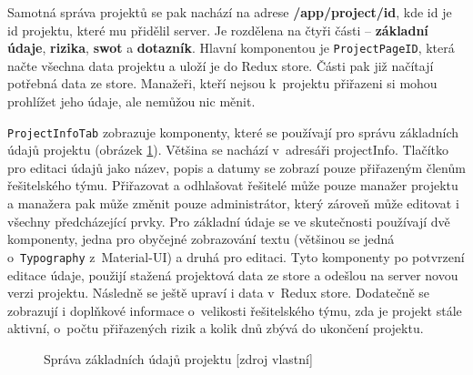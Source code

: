 Samotná správa projektů se pak nachází na adrese \textbf{/app/project/id}, kde id je id projektu, které mu přidělil server. Je rozdělena na čtyři části – \textbf{základní údaje}, \textbf{rizika}, \textbf{swot} a \textbf{dotazník}. Hlavní komponentou je \texttt{ProjectPageID}, která načte všechna data projektu a uloží je do Redux store. Části pak již načítají potřebná data ze store. Manažeři, kteří nejsou k~projektu přiřazeni si mohou prohlížet jeho údaje, ale nemůžou nic měnit.

\texttt{ProjectInfoTab} zobrazuje komponenty, které se používají pro správu základních údajů projektu (obrázek \ref{projinfo}). Většina se nachází v~adresáři projectInfo. Tlačítko pro editaci údajů jako název, popis a datumy se zobrazí pouze přiřazeným členům řešitelského týmu. Přiřazovat a odhlašovat řešitelé může pouze manažer projektu a manažera pak může změnit pouze administrátor, který zároveň může editovat i všechny předcházející prvky. Pro základní údaje se ve skutečnosti používají dvě komponenty, jedna pro obyčejné zobrazování textu (většinou se jedná o~\texttt{Typography} z~Material-UI) a druhá pro editaci. Tyto komponenty po potvrzení editace údaje, použijí stažená projektová data ze store a odešlou na server novou verzi projektu. Následně se ještě upraví i data v~Redux store. Dodatečně se zobrazují i doplňkové informace o~velikosti řešitelského týmu, zda je projekt stále aktivní, o~počtu přiřazených rizik a kolik dnů zbývá do ukončení projektu.

    \begin{figure}[ht]
    \begin{center}
    \caption{Správa základních údajů projektu [zdroj vlastní]}
    \label{projinfo}
    \end{center}
    \end{figure}
    

